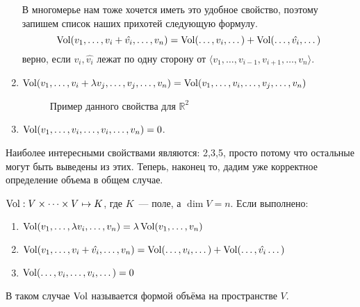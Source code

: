 \begin{enumerate}
         В многомерье нам тоже хочется иметь это удобное свойство, поэтому запишем
         список наших прихотей следующую формулу.
         \[
             \operatorname{Vol}(v_1,\dots, v_i + \hat{v_i}, \dots, v_n) = \operatorname{Vol}(\dots, v_i, \dots) + \operatorname{Vol}(\dots,\hat{v_i},\dots)
         \]
         верно, если $v_i, \hat{v_i}$ лежат по одну сторону от $\langle v_1, \dots, v_{i - 1}, v_{i + 1}, \dots, v_n\rangle$.
     \item $\operatorname{Vol}(v_1,\dots, v_i + \lambda v_j, \dots, v_j, \dots, v_n) 
         = \operatorname{Vol}(v_1,\dots, v_i,\dots, v_j, \dots, v_n)$ 
        \begin{figure}[H]
            \centering
            \caption{Пример данного свойства для $\mathbb{R}^2$}
            \label{fig:3}
        \end{figure}
     \item $\operatorname{Vol}(v_1,\dots, v_i, \dots, v_i, \dots, v_n) = 0$.
\end{enumerate}

Наиболее интересными свойствами являются: 2,3,5, просто потому что остальные могут быть выведены из этих.
Теперь, наконец то, дадим уже корректное определение объема в общем случае.

\begin{definition}
    $\operatorname{Vol}: V\times \dots \times V \mapsto K$, где $K$~--- поле, а $\dim V = n$. Если выполнено:
    \begin{enumerate}
        \item $\operatorname{Vol}(v_1,\dots, \lambda v_i, \dots, v_n) = \lambda \operatorname{Vol}(v_1,\dots, v_n)$
        \item $\operatorname{Vol}(v_1,\dots, v_i + \hat{v_i}, \dots, v_n) = 
            \operatorname{Vol}(\dots, v_i, \dots ) + \operatorname{Vol}(\dots, \hat{v_i} \dots)$
        \item $\operatorname{Vol}(\dots, v_i, \dots, v_i, \dots) = 0$
    \end{enumerate}
    В таком случае $\operatorname{Vol}$ называется формой объёма на пространстве $V$.
\end{definition}
